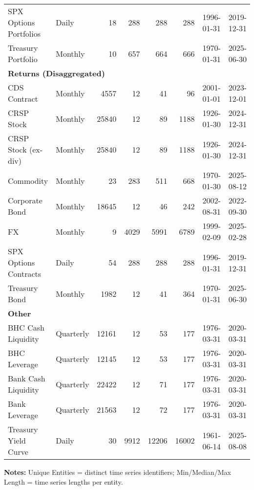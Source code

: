 \begin{table}[htbp]
\begin{tabular}{@{}llrrrrll@{}}
SPX Options Portfolios & Daily & 18 & 288 & 288 & 288 & 1996-01-31 & 2019-12-31 \\
Treasury Portfolio & Monthly & 10 & 657 & 664 & 666 & 1970-01-31 & 2025-06-30 \\
\midrule
\multicolumn{8}{l}{\textbf{Returns (Disaggregated)}} \\
CDS Contract & Monthly & 4557 & 12 & 41 & 96 & 2001-01-01 & 2023-12-01 \\
CRSP Stock & Monthly & 25840 & 12 & 89 & 1188 & 1926-01-30 & 2024-12-31 \\
CRSP Stock (ex-div) & Monthly & 25840 & 12 & 89 & 1188 & 1926-01-30 & 2024-12-31 \\
Commodity & Monthly & 23 & 283 & 511 & 668 & 1970-01-30 & 2025-08-12 \\
Corporate Bond & Monthly & 18645 & 12 & 46 & 242 & 2002-08-31 & 2022-09-30 \\
FX & Monthly & 9 & 4029 & 5991 & 6789 & 1999-02-09 & 2025-02-28 \\
SPX Options Contracts & Daily & 54 & 288 & 288 & 288 & 1996-01-31 & 2019-12-31 \\
Treasury Bond & Monthly & 1982 & 12 & 41 & 364 & 1970-01-31 & 2025-06-30 \\
\midrule
\multicolumn{8}{l}{\textbf{Other}} \\
BHC Cash Liquidity & Quarterly & 12161 & 12 & 53 & 177 & 1976-03-31 & 2020-03-31 \\
BHC Leverage & Quarterly & 12145 & 12 & 53 & 177 & 1976-03-31 & 2020-03-31 \\
Bank Cash Liquidity & Quarterly & 22422 & 12 & 71 & 177 & 1976-03-31 & 2020-03-31 \\
Bank Leverage & Quarterly & 21563 & 12 & 72 & 177 & 1976-03-31 & 2020-03-31 \\
Treasury Yield Curve & Daily & 30 & 9912 & 12206 & 16002 & 1961-06-14 & 2025-08-08 \\
\bottomrule
\end{tabular}
\vspace{0.1cm}
\begin{minipage}{\textwidth}
\scriptsize
\textbf{Notes:} Unique Entities = distinct time series identifiers; Min/Median/Max Length = time series lengths per entity.
\end{minipage}
\end{table}